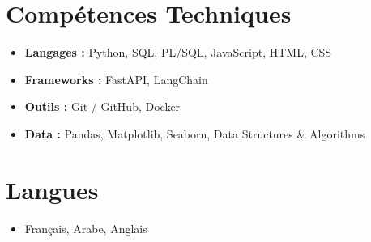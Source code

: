 \documentclass[a4paper,11pt]{article}
\begin{document}
\section*{Compétences Techniques}
\begin{itemize}[leftmargin=*, noitemsep]
    \item \textbf{Langages :} Python, SQL, PL/SQL, JavaScript, HTML, CSS
    \item \textbf{Frameworks :} FastAPI, LangChain
    \item \textbf{Outils :} Git / GitHub, Docker
    \item \textbf{Data :} Pandas, Matplotlib, Seaborn, Data Structures \& Algorithms
\end{itemize}

\section*{Langues}
\begin{itemize}[leftmargin=*, noitemsep]
    \item Français, Arabe, Anglais
\end{itemize}
\end{document}
